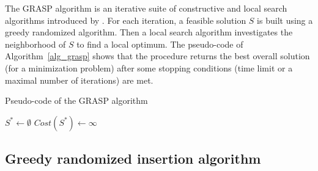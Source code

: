 \documentclass{article}
\begin{document}
The GRASP algorithm is an iterative suite of constructive and local search algorithms introduced by \cite{feo1995greedy}. For each iteration, a feasible solution $S$ is built using a greedy randomized algorithm. Then a local search algorithm investigates the neighborhood of  $S$ to find a local optimum. The pseudo-code of Algorithm~\ref{alg_grasp} shows that the procedure returns the best overall solution (for a minimization problem) after some stopping conditions (time limit or a maximal number of iterations) are met. 

{
    {\small
        \begin{algorithm}[hpt]
            \caption{Pseudo-code of the GRASP algorithm }
            \label{alg_grasp}
            \DontPrintSemicolon
            \LinesNumbered
            \setcounter{AlgoLine}{0}
            $S^* \leftarrow \emptyset$    \hspace{2mm}       $Cost(S^*) \leftarrow \infty$



        \end{algorithm}}
}
 

\subsection{Greedy randomized insertion algorithm}
\end{document}
